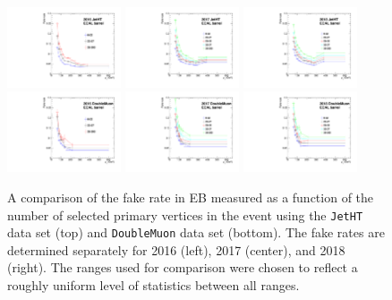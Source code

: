 \begin{figure}[!htbp]
\centering
\includegraphics[width=0.3\textwidth]{fig/compare_pv_EB_2016_jetht.pdf}
\includegraphics[width=0.3\textwidth]{fig/compare_pv_EB_2017_jetht.pdf}
\includegraphics[width=0.3\textwidth]{fig/compare_pv_EB_2018_jetht.pdf}\\
\includegraphics[width=0.3\textwidth]{fig/compare_pv_EB_2016_doublemuon.pdf}
\includegraphics[width=0.3\textwidth]{fig/compare_pv_EB_2017_doublemuon.pdf}
\includegraphics[width=0.3\textwidth]{fig/compare_pv_EB_2018_doublemuon.pdf}
\caption{A comparison of the fake rate in EB measured as a function of the number of selected primary vertices in the event using the \texttt{JetHT} data set (top) and \texttt{DoubleMuon} data set (bottom). The fake rates are determined separately for 2016 (left), 2017 (center), and 2018 (right). The ranges used for comparison were chosen to reflect a roughly uniform level of statistics between all ranges.}
\label{fig:frpileup_EB}
\end{figure}

